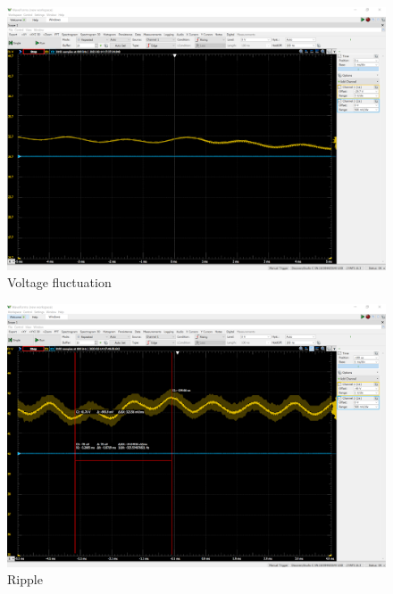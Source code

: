 \documentclass[11pt,letterpaper,conference]{IEEEtran}
\begin{document}
\FloatBarrier
\begin{figure}[th]
    \centering
    \includegraphics[width=\textwidth]{images/osc_voltage.png}
    \caption{Voltage fluctuation}
    \label{img:osc_voltage}
\end{figure}
\begin{figure}[th]
    \centering
    \includegraphics[width=\textwidth]{images/osc_ripple.png}
    \caption{Ripple}
    \label{img:osc_ripple}
\end{figure}

\clearpage
\end{document}
